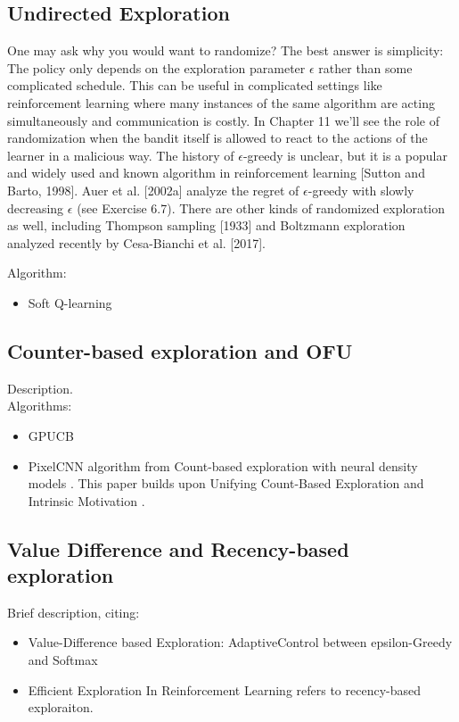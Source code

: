 \subsection{Undirected Exploration}
One may ask why you would want to randomize? The
best answer is simplicity: The policy only depends on the exploration parameter $\epsilon$ rather than some complicated schedule. This can be useful in complicated settings like reinforcement learning where many instances of the same algorithm are acting simultaneously and communication is costly. In Chapter 11 we’ll see the role of randomization when the bandit itself is allowed to react to the actions
of the learner in a malicious way. The history of $\epsilon$-greedy is unclear, but it is a
popular and widely used and known algorithm in reinforcement learning [Sutton
and Barto, 1998]. Auer et al. [2002a] analyze the regret of $\epsilon$-greedy with slowly
decreasing $\epsilon$ (see Exercise 6.7). There are other kinds of randomized exploration as well, including Thompson sampling [1933] and Boltzmann exploration analyzed recently by Cesa-Bianchi et al. [2017].

Algorithm:
\begin{itemize}
\item Soft Q-learning \cite{haarnoja2017reinforcement}
\end{itemize}

\subsection{Counter-based exploration and OFU}
Description. \\
Algorithms:
\begin{itemize}
\item GPUCB \cite{srinivas2010gaussian}
\item  PixelCNN algorithm from Count-based exploration with neural density models \cite{ostrovski2017count}. This paper builds upon Unifying Count-Based Exploration and Intrinsic Motivation \cite{bellemare2016unifying}. %
\end{itemize}

\subsection{Value Difference and Recency-based exploration}
Brief description, citing:
\begin{itemize}
\item  Value-Difference based Exploration: AdaptiveControl between epsilon-Greedy and Softmax \cite{tokic2011value}
\item Efficient Exploration In Reinforcement Learning \cite{thrun1992efficient} refers to recency-based exploraiton.
\end{itemize}

